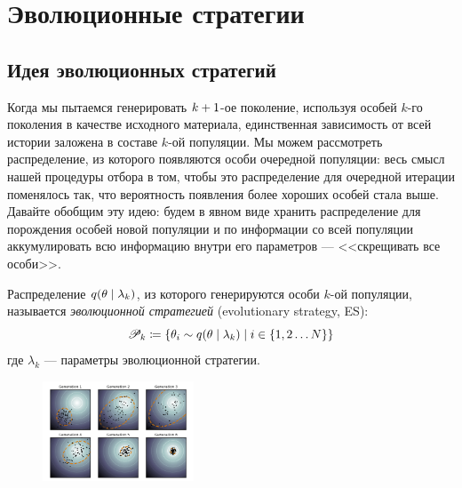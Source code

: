\section{Эволюционные стратегии}

\subsection{Идея эволюционных стратегий}

Когда мы пытаемся генерировать $k \HM+ 1$-ое поколение, используя особей $k$-го поколения в качестве исходного материала, единственная зависимость от всей истории заложена в составе $k$-ой популяции. Мы можем рассмотреть распределение, из которого появляются особи очередной популяции: весь смысл нашей процедуры отбора в том, чтобы это распределение для очередной итерации поменялось так, что вероятность появления более хороших особей стала выше. Давайте обобщим эту идею: будем в явном виде хранить распределение для порождения особей новой популяции и по информации со всей популяции аккумулировать всю информацию внутри его параметров --- <<скрещивать все особи>>.

\begin{definition}
Распределение $q(\theta \HM\mid \lambda_k)$, из которого генерируются особи $k$-ой популяции, называется \emph{эволюционной стратегией} (evolutionary strategy, ES):
$$\Pop_{k} \coloneqq \{\theta_i \sim q(\theta \HM\mid \lambda_k) \mid i \in \{1, 2 \dots N\} \}$$
где $\lambda_k$ --- параметры эволюционной стратегии.
\end{definition}

\begin{figure}
\centering
\vspace{-0.6cm}
\includegraphics[width=0.4\textwidth]{Images/evolution_strategy.png}
\vspace{-0.5cm}
\end{figure}

